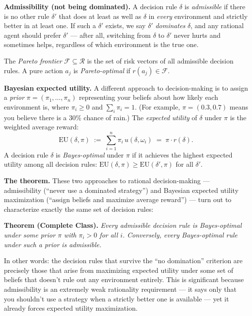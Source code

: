 \documentclass[8pt]{article}
\begin{document}
\medskip
\noindent
\textbf{Admissibility (not being dominated).} A decision rule $\delta$ is
\emph{admissible} if there is no other rule $\delta'$ that does at least as well as
$\delta$ in \emph{every} environment and strictly better in at least one. If such a
$\delta'$ exists, we say $\delta'$ \emph{dominates} $\delta$, and any rational agent
should prefer $\delta'$ --- after all, switching from $\delta$ to $\delta'$ never
hurts and sometimes helps, regardless of which environment is the true one.

\medskip
\noindent
The \emph{Pareto frontier} $\mathcal{F} \subseteq \mathcal{R}$ is the set of risk
vectors of all admissible decision rules. A pure action $a_j$ is
\emph{Pareto-optimal} if $r(a_j) \in \mathcal{F}$.

\medskip
\noindent
\textbf{Bayesian expected utility.} A different approach to decision-making is to
assign a \emph{prior} $\pi = (\pi_1, \ldots, \pi_n)$ representing your beliefs about
how likely each environment is, where $\pi_i \geq 0$ and $\sum_i \pi_i = 1$. (For
example, $\pi = (0.3, 0.7)$ means you believe there is a $30\%$ chance of rain.) The
\emph{expected utility} of $\delta$ under $\pi$ is the weighted average reward:
\[
  \mathrm{EU}(\delta, \pi) \;:=\;
  \sum_{i=1}^n \pi_i\, u(\delta, \omega_i) \;=\; \pi \cdot r(\delta).
\]
A decision rule $\delta$ is \emph{Bayes-optimal} under $\pi$ if it achieves the
highest expected utility among all decision rules:
$\mathrm{EU}(\delta, \pi) \geq \mathrm{EU}(\delta', \pi)$ for all $\delta'$.

\medskip
\noindent
\textbf{The theorem.} These two approaches to rational decision-making ---
admissibility (``never use a dominated strategy'') and Bayesian expected utility
maximization (``assign beliefs and maximize average reward'') --- turn out to
characterize exactly the same set of decision rules:

\medskip
\noindent
\textbf{Theorem (Complete Class).} \emph{Every admissible decision rule is
Bayes-optimal under some prior $\pi$ with $\pi_i > 0$ for all $i$. Conversely, every
Bayes-optimal rule under such a prior is admissible.}

\medskip
\noindent
In other words: the decision rules that survive the ``no domination'' criterion are
precisely those that arise from maximizing expected utility under some set of beliefs
that doesn't rule out any environment entirely. This is significant because
admissibility is an extremely weak rationality requirement --- it says only that you
shouldn't use a strategy when a strictly better one is available --- yet it already
forces expected utility maximization.
\end{document}
